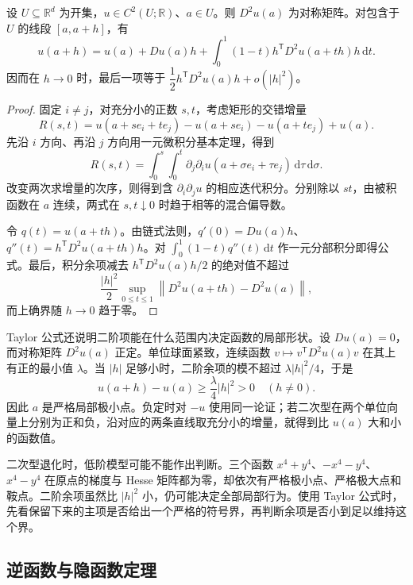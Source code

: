 \begin{proposition}[二阶 Taylor 公式]\label{b2:prop:01-taylor}
设 \(U\subseteq\mathbb R^d\) 为开集，\(u\in C^2(U;\mathbb R)\)、\(a\in U\)。则 \(D^2u(a)\) 为对称矩阵。对包含于 \(U\) 的线段 \([a,a+h]\)，有
\[
 u(a+h)=u(a)+Du(a)h+
 \int_0^1(1-t)h^{\mathsf T}D^2u(a+th)h\,\mathrm{d}t.
\]
因而在 \(h\to0\) 时，最后一项等于
\(\dfrac12 h^{\mathsf T}D^2u(a)h+o(\lvert h\rvert^2)\)。
\end{proposition}
\begin{proof}
固定 \(i\ne j\)，对充分小的正数 \(s,t\)，考虑矩形的交错增量
\[
 R(s,t)=u(a+se_i+te_j)-u(a+se_i)-u(a+te_j)+u(a).
\]
先沿 \(i\) 方向、再沿 \(j\) 方向用一元微积分基本定理，得到
\[
 R(s,t)=\int_0^s\int_0^t
 \partial_j\partial_i u(a+\sigma e_i+\tau e_j)
 \,\mathrm{d}\tau\,\mathrm{d}\sigma.
\]
改变两次求增量的次序，则得到含 \(\partial_i\partial_j u\) 的相应迭代积分。分别除以 \(st\)，由被积函数在 \(a\) 连续，两式在 \(s,t\downarrow0\) 时趋于相等的混合偏导数。

令 \(q(t)=u(a+th)\)。由链式法则，\(q'(0)=Du(a)h\)、\(q''(t)=h^{\mathsf T}D^2u(a+th)h\)。对 \(\int_0^1(1-t)q''(t)\,\mathrm{d}t\) 作一元分部积分即得公式。最后，积分余项减去 \(h^{\mathsf T}D^2u(a)h/2\) 的绝对值不超过
\[
 \frac{\lvert h\rvert^2}{2}
 \sup_{0\leq t\leq1}\left\lVert D^2u(a+th)-D^2u(a)\right\rVert,
\]
而上确界随 \(h\to0\) 趋于零。
\end{proof}

Taylor 公式还说明二阶项能在什么范围内决定函数的局部形状。设 \(Du(a)=0\)，而对称矩阵 \(D^2u(a)\) 正定。单位球面紧致，连续函数 \(v\mapsto v^{\mathsf T}D^2u(a)v\) 在其上有正的最小值 \(\lambda\)。当 \(|h|\) 足够小时，二阶余项的模不超过 \(\lambda|h|^2/4\)，于是
\[
 u(a+h)-u(a)\geq\frac{\lambda}{4}|h|^2>0\quad(h\ne0).
\]
因此 \(a\) 是严格局部极小点。负定时对 \(-u\) 使用同一论证；若二次型在两个单位向量上分别为正和负，沿对应的两条直线取充分小的增量，就得到比 \(u(a)\) 大和小的函数值。

\ProseParagraphBreak

二次型退化时，低阶模型可能不能作出判断。三个函数 \(x^4+y^4\)、\(-x^4-y^4\)、\(x^4-y^4\) 在原点的梯度与 Hesse 矩阵都为零，却依次有严格极小点、严格极大点和鞍点。二阶余项虽然比 \(|h|^2\) 小，仍可能决定全部局部行为。使用 Taylor 公式时，先看保留下来的主项是否给出一个严格的符号界，再判断余项是否小到足以维持这个界。

\subsection{逆函数与隐函数定理}
\label{b2:subsec:010103}

